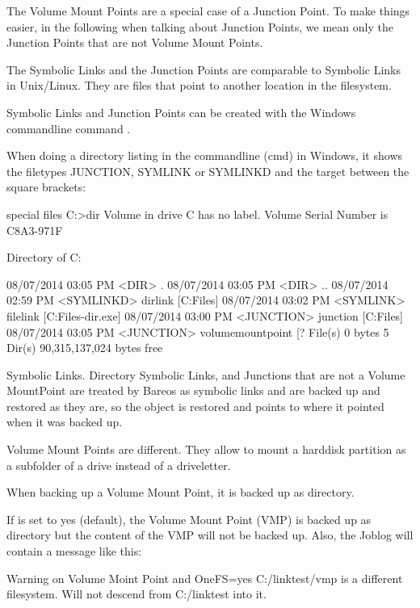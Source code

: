 The Volume Mount Points are a special case of a Junction Point. To make things easier, in the following when talking about Junction Points, we mean only the Junction Points that are not Volume Mount Points.

The Symbolic Links and the Junction Points are comparable to Symbolic Links in Unix/Linux. They are files that point to another location in the filesystem.

Symbolic Links and Junction Points can be created with the Windows commandline command .

When doing a directory listing in the commandline (cmd) in Windows, 
it shows the filetypes JUNCTION, SYMLINK or SYMLINKD and the target between the square brackets:

\begin{commands}{special files}
C:\linktest>dir
 Volume in drive C has no label.
 Volume Serial Number is C8A3-971F

 Directory of C:\linktest

08/07/2014  03:05 PM    <DIR>          .
08/07/2014  03:05 PM    <DIR>          ..
08/07/2014  02:59 PM    <SYMLINKD>     dirlink [C:\Program Files\Bareos]
08/07/2014  03:02 PM    <SYMLINK>      filelink [C:\Program Files\Bareos\bareos-dir.exe]
08/07/2014  03:00 PM    <JUNCTION>     junction [C:\Program Files\Bareos]
08/07/2014  03:05 PM    <JUNCTION>     volumemountpoint [\?? File(s)              0 bytes
               5 Dir(s)  90,315,137,024 bytes free
\end{commands}

Symbolic Links. Directory Symbolic Links, and Junctions that are not a Volume MountPoint are treated by Bareos as symbolic links and are backed up and restored as they are, so the object is restored and points to where it pointed when it was backed up.

Volume Mount Points are different. They allow to mount a harddisk partition as a subfolder of a drive instead of a driveletter.

When backing up a Volume Mount Point, it is backed up as directory.

If  is set to yes (default), the Volume Mount Point (VMP) is backed up as directory but the content of the VMP will not be backed up. Also, the Joblog will contain a message like this:

\begin{bmessage}{Warning on Volume Moint Point and OneFS=yes}
C:/linktest/vmp is a different filesystem. Will not descend from C:/linktest into it.
\end{bmessage}


